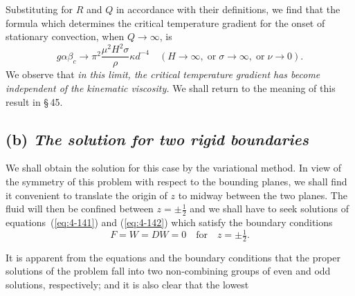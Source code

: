 
Substituting for $R$ and $Q$ in accordance with their definitions, we find that the formula which determines the critical temperature gradient for the onset of stationary convection, when $Q\to\infty$, is
\begin{equation}
\label{eq:4-169}
g\alpha\beta_c \to \pi^2\frac{\mu^2 H^2\sigma}{\rho}\kappa d^{-4} \quad (H\to\infty,\;\text{or}\;\sigma\to\infty,\;\text{or}\;\nu\to 0).
\end{equation}
We observe that \emph{in this limit, the critical temperature gradient has become independent of the kinematic viscosity.} We shall return to the meaning of this result in \S\,45.

\subsection*{(b) \emph{The solution for two rigid boundaries}}

We shall obtain the solution for this case by the variational method. In view of the symmetry of this problem with respect to the bounding planes, we shall find it convenient to translate the origin of $z$ to midway between the two planes. The fluid will then be confined between $z=\pm\tfrac{1}{2}$ and we shall have to seek solutions of equations~(\ref{eq:4-141}) and (\ref{eq:4-142}) which satisfy the boundary conditions
\begin{equation}
\label{eq:4-170}
F = W = DW = 0 \quad \text{for}\quad z = \pm\tfrac{1}{2}.
\end{equation}

It is apparent from the equations and the boundary conditions that the proper solutions of the problem fall into two non-combining groups of even and odd solutions, respectively; and it is also clear that the lowest

